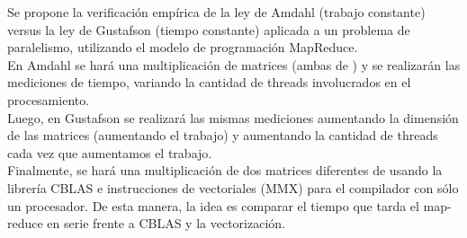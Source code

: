 Se propone la verificación empírica de la ley de Amdahl  (trabajo constante)
versus la ley de  Gustafson (tiempo constante) aplicada a un problema de
paralelismo, utilizando el modelo de programación MapReduce.\\
En Amdahl se hará una multiplicación de matrices (ambas de ) y se
realizarán las mediciones de tiempo, variando la cantidad de threads involucrados
en el procesamiento.\\
Luego, en Gustafson se realizará las mismas mediciones aumentando la dimensión
de las matrices (aumentando el trabajo) y aumentando la cantidad de threads cada
vez que aumentamos el trabajo.\\
Finalmente, se hará una multiplicación de dos matrices diferentes de 
usando la librería CBLAS e instrucciones de vectoriales (MMX) para el compilador
con sólo un procesador. De esta manera, la idea es comparar el tiempo que tarda
el map-reduce en serie frente a CBLAS y la vectorización.
